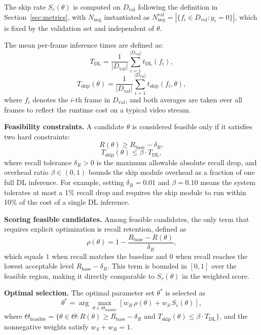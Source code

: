 The skip rate $S_r(\theta)$ is computed on $D_{\text{val}}$ following the
definition in Section~\ref{sec:metrics}, with $N_{\text{neg}}$ instantiated as
$N_{\text{neg}}^{\text{val}} = |\{f_i \in D_{\text{val}} : y_i = 0\}|$, which
is fixed by the validation set and independent of $\theta$.

The mean per-frame inference times are defined as:
\begin{equation}
    T_{\text{DL}} = \frac{1}{|D_{\text{val}}|}
    \sum_{i=1}^{|D_{\text{val}}|} t_{\text{DL}}(f_i),
\end{equation}
\begin{equation}
    T_{\text{skip}}(\theta) = \frac{1}{|D_{\text{val}}|}
    \sum_{i=1}^{|D_{\text{val}}|} t_{\text{skip}}(f_i, \theta),
\end{equation}
where $f_i$ denotes the $i$-th frame in $D_{\text{val}}$, and both averages are
taken over all frames to reflect the runtime cost on a typical video stream.

\textbf{Feasibility constraints.} A candidate $\theta$ is considered feasible
only if it satisfies two hard constraints:
\begin{equation}
    R(\theta) \geq R_{\text{base}} - \delta_R,
\end{equation}
\begin{equation}
    T_{\text{skip}}(\theta) \leq \beta \cdot T_{\text{DL}},
\end{equation}
where recall tolerance $\delta_R > 0$ is the maximum allowable absolute recall
drop, and overhead ratio $\beta \in (0, 1)$ bounds the skip module overhead as
a fraction of one full DL inference. For example, setting $\delta_R = 0.01$ and
$\beta = 0.10$ means the system tolerates at most a 1\% recall drop and requires
the skip module to run within 10\% of the cost of a single DL inference.

\textbf{Scoring feasible candidates.} Among feasible candidates, the only term
that requires explicit optimization is recall retention, defined as
\begin{equation}
    \rho(\theta) = 1 - \frac{R_{\text{base}} - R(\theta)}{\delta_R},
\end{equation}
which equals $1$ when recall matches the baseline and $0$ when recall reaches
the lowest acceptable level $R_{\text{base}} - \delta_R$. This term is bounded
in $[0, 1]$ over the feasible region, making it directly comparable to
$S_r(\theta)$ in the weighted score.

\textbf{Optimal selection.} The optimal parameter set $\theta^*$ is selected as
\begin{equation}
    \theta^* = \arg\max_{\theta \in \Theta_{\text{feasible}}}
    \left[ w_R\,\rho(\theta) + w_S\,S_r(\theta) \right],
\end{equation}
where $\Theta_{\text{feasible}} = \{\theta \in \Theta : R(\theta) \geq
R_{\text{base}} - \delta_R \text{ and } T_{\text{skip}}(\theta) \leq \beta
\cdot T_{\text{DL}}\}$, and the nonnegative weights satisfy $w_S + w_R = 1$.

